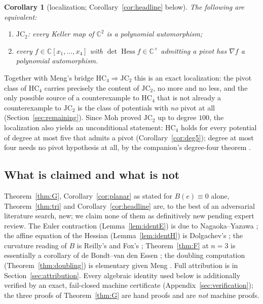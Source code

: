 \documentclass[11pt]{article}
\theoremstyle{plain}
\newtheorem{corollary}[theorem]{Corollary}
\theoremstyle{definition}
\newcommand{\C}{\mathbb{C}}
\newcommand{\Hess}{\operatorname{Hess}}
\newcommand{\HC}{\mathrm{HC}}
\newcommand{\JC}{\mathrm{JC}}
\begin{document}
\begin{corollary}[localization; Corollary~\ref{cor:headline} below]
The following are equivalent:
\begin{enumerate}
\item[\rm(a)] $\JC_2$: every Keller map of $\C^2$ is a polynomial
automorphism;
\item[\rm(b)] every $f\in\C[x_1,\dots,x_4]$ with $\det\Hess f\in
\C^{\times}$ admitting a pivot has $\nabla f$ a polynomial automorphism.
\end{enumerate}
\end{corollary}

Together with Meng's bridge $\HC_4\Rightarrow\JC_2$ this is an exact
localization: the pivot class of $\HC_4$ carries precisely the content of
$\JC_2$, no more and no less, and the only possible source of a
counterexample to $\HC_4$ that is not already a counterexample to $\JC_2$
is the class of potentials with \emph{no} pivot at all
(Section~\ref{sec:remaining}). Since Moh \cite{Moh} proved $\JC_2$ up to
degree $100$, the localization also yields an unconditional statement:
$\HC_4$ holds for every potential of degree at most five that admits a
pivot (Corollary~\ref{cor:deg5}); degree at most four needs no pivot
hypothesis at all, by the companion's degree-four theorem
\cite{companion}.

\subsection{What is claimed and what is not}

Theorem~\ref{thm:G}, Corollary~\ref{cor:planar} as stated for
$B(e)\equiv0$ alone, Theorem~\ref{thm:tri} and
Corollary~\ref{cor:headline} are, to the best of an adversarial
literature search, new; we claim none of them as definitively new pending
expert review. The Euler contraction (Lemma~\ref{lem:identE}) is due to
Nagaoka--Yazawa \cite{NY}; the affine equation of the Hessian
(Lemma~\ref{lem:identH}) is Dolgachev's \cite{Dolgachev}; the curvature
reading of $B$ is Reilly's and Fox's \cite{Reilly,Fox2017};
Theorem~\ref{thm:F} at $n=3$ is essentially a corollary of de Bondt--van
den Essen \cite{dBvdE}; the doubling computation
(Theorem~\ref{thm:doubling}) is elementary given Meng \cite{Meng2006}.
Full attribution is in Section~\ref{sec:attribution}. Every algebraic
identity used below is additionally verified by an exact, fail-closed
machine certificate (Appendix~\ref{sec:verification}); the three proofs of
Theorem~\ref{thm:G} are hand proofs and are \emph{not} machine proofs.
\end{document}
